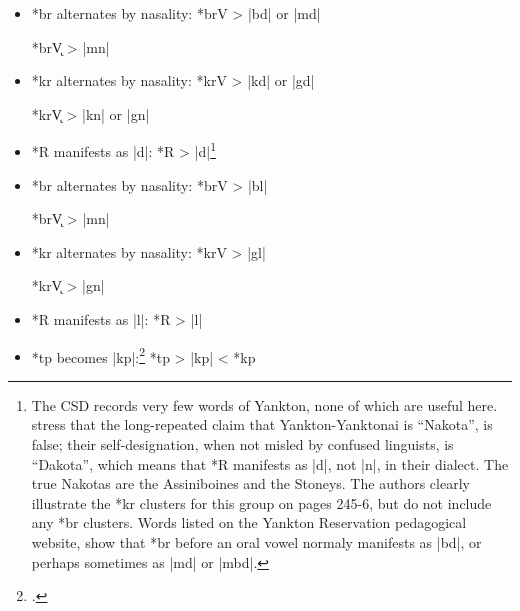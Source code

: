 \documentclass[output=paper]{LSP/langsci}
\begin{document}

\begin{itemize}
\item *br alternates by nasality: \hspace{1em} *brV	>	|bd| or |md|

\hspace{12em} *br\k{V} 	>	|mn|
\item  *kr alternates by nasality:  \hspace{1.2em} *krV       >          |kd| or |gd|

\hspace{12em} *kr\k{V} 	>	|kn| or |gn|

\item *R manifests as |d|: \hspace{4.5em} *R	>	|d|\footnote{The CSD records very few words of Yankton, none of which are useful here.  \citet{ParksDeMallie1992} stress that the long-repeated claim that Yankton-Yanktonai is ``Nakota'', is false; their self-designation, when not misled by confused linguists, is ``Dakota'', which means that *R manifests as |d|, not |n|, in their dialect.  The true Nakotas are the Assiniboines and the Stoneys.  The authors clearly illustrate the *kr clusters for this group on pages 245-6, but do not include any *br clusters.  Words listed on the Yankton Reservation pedagogical website, \citet{HubbelingEtAl2015} show that *br before an oral vowel normaly manifests as |bd|, or perhaps sometimes as |md| or |mbd|.}
\end{itemize}


\begin{itemize}
\item  *br alternates by nasality:  \hspace{1em} *brV	>	|bl|

\hspace{12em} *br\k{V}	>	|mn|

\item  *kr alternates by nasality: \hspace{1em}   *krV       >          |gl|

\hspace{12em} *kr\k{V}	>	|gn|
\item *R manifests as |l|: \hspace{4.5em} *R	>	|l|
\item *tp becomes |kp|:\footnote{\citealt[253, 265, 865]{CSD2006}.} \hspace{4.5em} *tp	>	|kp|	 <	*kp
 \end{itemize}
 
\end{document}
